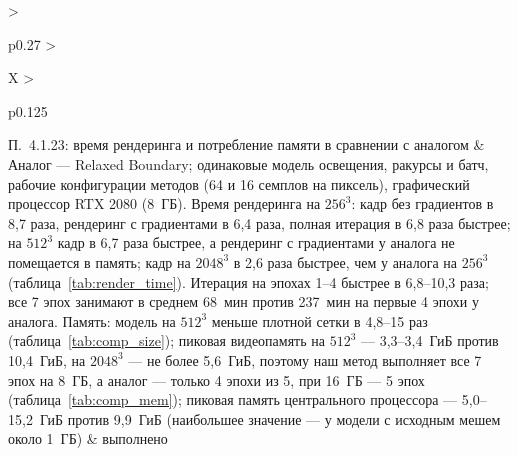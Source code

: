 {\begin{xltabular}{\textwidth}{>{\raggedright\arraybackslash}p{0.27\textwidth} >{\raggedright\arraybackslash}X >{\raggedright\arraybackslash}p{0.125\textwidth}}
        П.~4.1.23: время рендеринга и потребление памяти в сравнении с аналогом
            & Аналог --- Relaxed Boundary; одинаковые модель освещения, ракурсы и батч, рабочие конфигурации методов (64 и 16 семплов на пиксель), графический процессор RTX 2080 (8~ГБ). Время рендеринга на $256^3$: кадр без градиентов в 8,7 раза, рендеринг с градиентами в 6,4 раза, полная итерация в 6,8 раза быстрее; на $512^3$ кадр в 6,7 раза быстрее, а рендеринг с градиентами у аналога не помещается в память; кадр на $2048^3$ в 2,6 раза быстрее, чем у аналога на $256^3$ (таблица~\ref{tab:render_time}). Итерация на эпохах 1--4 быстрее в 6,8--10,3 раза; все 7 эпох занимают в среднем 68~мин против 237~мин на первые 4 эпохи у аналога. Память: модель на $512^3$ меньше плотной сетки в 4,8--15 раз (таблица~\ref{tab:comp_size}); пиковая видеопамять на $512^3$ --- 3,3--3,4~ГиБ против 10,4~ГиБ, на $2048^3$ --- не более 5,6~ГиБ, поэтому наш метод выполняет все 7 эпох на 8~ГБ, а аналог --- только 4 эпохи из 5, при 16~ГБ --- 5 эпох (таблица~\ref{tab:comp_mem}); пиковая память центрального процессора --- 5,0--15,2~ГиБ против 9,9~ГиБ (наибольшее значение --- у модели с исходным мешем около 1~ГБ) & выполнено \\
        \end{xltabular}}

\endinput